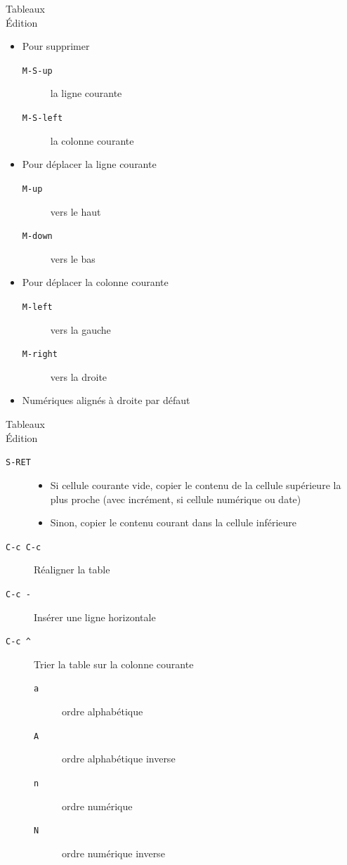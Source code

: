 \documentclass[presentation,t,hideothersubsections]{beamer}
\begin{document}
\begin{frame}[fragile,label=sec-3-3-3]{Tableaux \\ Édition}
 \begin{itemize}
\item Pour supprimer
\begin{description}
\item[\texttt{M-S-up}] la ligne courante
\item[\texttt{M-S-left}] la colonne courante
\end{description}
\item Pour déplacer la ligne courante
\begin{description}
\item[\texttt{M-up}] vers le haut
\item[\texttt{M-down}] vers le bas
\end{description}
\item Pour déplacer la colonne courante
\begin{description}
\item[\texttt{M-left}] vers la gauche
\item[\texttt{M-right}] vers la droite
\end{description}
\item Numériques alignés à droite par défaut
\end{itemize}
\end{frame}
\begin{frame}[fragile,label=sec-3-3-4]{Tableaux \\ Édition}
 \begin{description}
\item[\texttt{S-RET}] \begin{itemize}
\item Si cellule courante vide, copier le contenu de la cellule supérieure la
plus proche (avec incrément, si cellule numérique ou date)
\item Sinon, copier le contenu courant dans la cellule inférieure
\end{itemize}
\item[\texttt{C-c C-c}] Réaligner la table
\item[\texttt{C-c -}] Insérer une ligne horizontale
\item[\texttt{C-c \textasciicircum{}}] Trier la table sur la colonne courante
\begin{description}
\item[\texttt{a}] ordre alphabétique
\item[\texttt{A}] ordre alphabétique inverse
\item[\texttt{n}] ordre numérique
\item[\texttt{N}] ordre numérique inverse
\end{description}
\end{description}
\end{frame}
\end{document}
